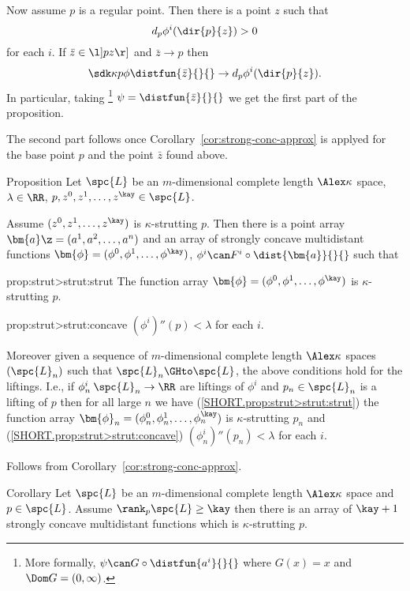 Now assume $p$ is a regular point. 
Then there is a point $z$ such that 
\[d_p\phi^i(\dir{p}{z})>0\]
for each $i$.
If $\bar z\in\l]pz\r]$ and $\bar z\to p$
then
\[\sdk\kappa p{\phi}{\distfun{\bar z}{}{}}\to d_p\phi^i(\dir{p}{z}).\]
In particular, 
taking%
\footnote{More formally, $\psi\can G\circ\distfun{a^i}{}{}$ where $G(x)=x$ and $\Dom G=(0,\infty)$.} $\psi=\distfun{\bar z}{}{}$ we get the first part of the proposition. 

The second part follows once Corollary~\ref{cor:strong-conc-approx} is applyed for the base point $p$ and the point $\bar z$ found above.
\qeds

\begin{thm}{Proposition}\label{prop:strut>strut}
Let $\spc{L}$ be an $m$-dimensional complete length $\Alex\kappa$ space,
$\lambda\in\RR$,
$p,z^0,z^1,\dots,z^\kay\in \spc{L}$.

Assume $(z^0,z^1,\dots,z^\kay)$ is $\kappa$-strutting $p$.
Then there is a point array
$\bm{a}\z=(a^1,a^2,\dots, a^{n})$
and an array of strongly concave multidistant functions 
$\bm{\phi}=(\phi^0,\phi^1,\dots,\phi^\kay)$, 
$\phi^i\can F^i\circ\dist{\bm{a}}{}{}$
such that 

\begin{subthm}{prop:strut>strut:strut}
The function array $\bm{\phi}=(\phi^0,\phi^1,\dots,\phi^\kay)$ is $\kappa$-strutting $p$.
\end{subthm}

\begin{subthm}{prop:strut>strut:concave}
$(\phi^i)''(p)<\lambda$ for each $i$.
\end{subthm}

Moreover given a sequence of  $m$-dimensional complete length $\Alex\kappa$ spaces $(\spc{L}_n)$
such that $\spc{L}_n\GHto \spc{L}$,
the above conditions hold for the liftings.
I.e., if $\phi_n^i\:\spc{L}_n\to\RR$ 
are liftings of $\phi^i$ 
and $p_n\in \spc{L}_n$ is a lifting of $p$
then 
for all large $n$ we have
(\ref{SHORT.prop:strut>strut:strut})
the function array $\bm{\phi}_n=(\phi_n^0,\phi_n^1,\dots,\phi_n^\kay)$ is $\kappa$-strutting $p_n$
and 
(\ref{SHORT.prop:strut>strut:concave}) $(\phi_n^i)''(p_n)<\lambda$ for each $i$.
\end{thm}

Follows from Corollary~\ref{cor:strong-conc-approx}.
\qeds

\begin{thm}{Corollary}
Let $\spc{L}$ be an $m$-dimensional complete length $\Alex\kappa$ space and $p\in  \spc{L}$.
Assume $\rank_p\spc{L}\ge \kay$
then there is an array 
of $\kay+1$ strongly concave
multidistant functions which is $\kappa$-strutting $p$.
\end{thm}

